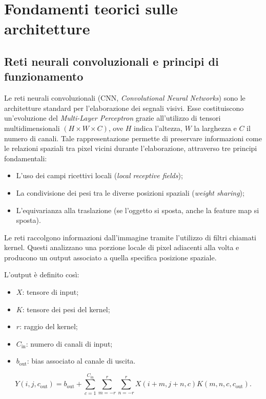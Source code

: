 \chapter{Fondamenti teorici sulle architetture}

\section{Reti neurali convoluzionali e principi di funzionamento}

Le reti neurali convoluzionali (CNN, \textit{Convolutional Neural Networks}) sono le architetture standard per l’elaborazione dei segnali visivi. Esse costituiscono un'evoluzione del \textit{Multi-Layer Perceptron} grazie all’utilizzo di tensori multidimensionali $(H \times W \times C)$, ove $H$ indica l'altezza, $W$ la larghezza e $C$ il numero di canali. Tale rappresentazione permette di preservare informazioni come le relazioni spaziali tra pixel vicini durante l’elaborazione, attraverso tre principi fondamentali:

\begin{itemize}
    \item L’uso dei campi ricettivi locali (\textit{local receptive fields});
    \item La condivisione dei pesi tra le diverse posizioni spaziali (\textit{weight sharing});
    \item L’equivarianza alla traslazione (se l’oggetto si sposta, anche la feature map si sposta).
\end{itemize}

Le reti raccolgono informazioni dall’immagine tramite l’utilizzo di filtri chiamati kernel. Questi analizzano una porzione locale di pixel adiacenti alla volta e producono un output associato a quella specifica posizione spaziale. 

L’output è definito così:

\begin{itemize}
    \item $X$: tensore di input;
    \item $K$: tensore dei pesi del kernel;
    \item $r$: raggio del kernel;
    \item $C_{\text{in}}$: numero di canali di input;
    \item $b_{\text{out}}$: bias associato al canale di uscita.
\end{itemize}

\begin{equation}
Y(i,j,c_{\text{out}}) =
b_{\text{out}}
+
\sum_{c=1}^{C_{\text{in}}}
\sum_{m=-r}^{r}
\sum_{n=-r}^{r}
X(i+m,j+n,c)
K(m,n,c,c_{\text{out}}).
\end{equation}

